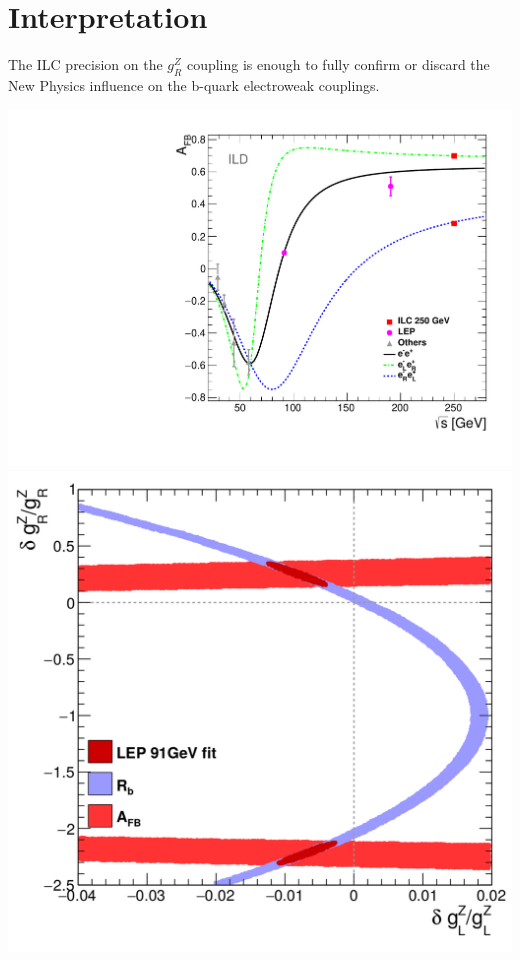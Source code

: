 

\section*{Interpretation}

The ILC precision on the $g_R^Z$ coupling is enough to fully confirm or discard the New Physics influence on the b-quark electroweak couplings. 
\begin{center}\vspace{0.5cm}
	
	\includegraphics[width=0.4\linewidth]{plots/afb-sqrts.pdf}
	\includegraphics[width=0.4\linewidth]{plots/lep-result-full.png}\\


\end{center}
